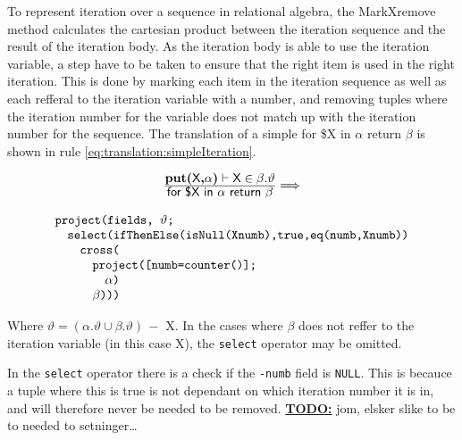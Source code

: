 To represent iteration over a sequence in relational algebra, the MarkXremove method calculates the cartesian
product between the iteration sequence and the result of the iteration body. As the iteration body is able to use
the iteration variable, a step have to be taken to ensure that the right item is used in the right iteration. This
is done by marking each item in the iteration sequence as well as each refferal to the iteration variable with a
number, and removing tuples where the iteration number for the variable does not match up with the iteration
number for the sequence. The translation of a simple \textsf{for \$X in} $\alpha$ \textsf{return} $\beta$ is shown
in rule \ref{eq:translation:simpleIteration}.

\begin{equation}
\centering
\begin{array}{c}
	\frac{\displaystyle \textbf{put(}\textsf{X}\textbf{,}\alpha\textbf{)}\vdash\textsf{X}\in\beta . \vartheta}
	{\displaystyle \textsf{for \$X in }\alpha	\textsf{ return }\beta}
	
	\Longrightarrow 
	\\
	\mbox{} \\
	
	\begin{array}{l}
	\mbox{\texttt{project(fields, }} \vartheta \mbox{\texttt{;}} \\ \quad
	\mbox{\texttt{select(ifThenElse(isNull(Xnumb),true,eq(numb,Xnumb))}} \\ \quad \quad 
	\mbox{\texttt{cross(}} \\ \quad \quad \quad
	\mbox{\texttt{project([numb=counter()];}} \\ \quad \quad \quad \quad
	\alpha \mbox{\texttt{)}} \\ \quad \quad \quad 
	\beta \mbox{\texttt{)))}}
	\end{array}
\end{array}
\label{eq:translation:simpleIteration}
\end{equation}

Where $\vartheta = (\alpha.\vartheta \cup \beta.\vartheta)\, -$ \textsf{X}. In the cases where $\beta$ does not
reffer to the iteration variable (in this case \textsf{X}), the \texttt{select} operator may be omitted.

In the \texttt{select} operator there is a check if the \texttt{-numb} field is \texttt{NULL}. This is becauce a
tuple where this is true is not dependant on which iteration number it is in, and will therefore never be needed
to be removed. \underline{\textbf{\Large TODO:}} jom, elsker slike to be to needed to setninger\ldots

